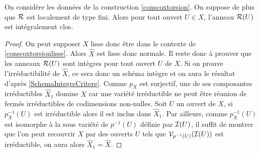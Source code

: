 \begin{thm}
On considère les données de la construction \ref{conscoxtorsion}. On suppose de plus que $\mathcal{R}$ est localement de type fini. Alors pour tout ouvert $U\in X$, l'anneau $\mathcal{R}(U)$ est intégralement clos.
\end{thm}
\begin{proof}
On peut supposer $X$ lisse donc être dans le contexte de \ref{conscoxtorsionlisse}. Alors $\widehat{X}$ est lisse donc normale. Il reste donc à prouver que les anneaux $\mathcal{R}(U)$ sont intègres pour tout ouvert $U$ de $X$. Si on prouve l'irréductibilité de $\widehat{X}$, ce sera donc un schéma intègre et on aura le résultat d'après \ref{SchemaIntegreCritere}. Comme $p_X$ est surjectif, une de ses composantes irréductibles $\widehat{X}_1$ domine $X$ car une variété irréductible ne peut être réunion de fermés irréductibles de codimensions non-nulles. Soit $U$ un ouvert de $X$, si $p_X^{-1}(U)$ est irréductible alors il est inclus dans $\widehat{X}_1$. Par ailleurs, comme $p_X^{-1}(U)$ est isomorphe à la sous variété de $p^{-1}(U)$ définie par $\mathcal{I}(U)$, il suffit de montrer que l'on peut recouvrir $X$ par des ouverts $U$ tels que $\mathcal{V}_{p^{-1}(U)}(\mathcal{I}(U))$ est irréductible, on aura alors $\widehat{X}_1=\widehat{X}$.


\end{proof}
